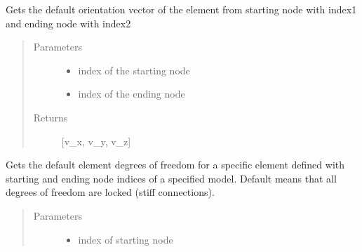 \documentclass[letterpaper,10pt,english]{sphinxmanual}
\begin{document}
\begin{fulllineitems}
\begin{fulllineitems}
\label{\detokenize{api:beamon.database.database.Database.get_default_link_orientation}}
Gets the default orientation vector of the element from starting node with index1 and ending node with index2
\begin{quote}\begin{description}
\item[{Parameters}] \leavevmode\begin{itemize}
\item {} 
 \textendash{} index of the starting node

\item {} 
 \textendash{} index of the ending node

\end{itemize}

\item[{Returns}] \leavevmode
{[}v\_x, v\_y, v\_z{]}

\end{description}\end{quote}

\end{fulllineitems}


\begin{fulllineitems}
\label{\detokenize{api:beamon.database.database.Database.get_default_static_edof}}
Gets the default element degrees of freedom for a specific element defined with starting and
ending node indices of a specified model. Default means that all degrees of freedom are locked
(stiff connections).
\begin{quote}\begin{description}
\item[{Parameters}] \leavevmode\begin{itemize}
\item {} 
 \textendash{} index of starting node


\end{itemize}
\end{description}
\end{quote}
\end{fulllineitems}
\end{fulllineitems}
\end{document}
